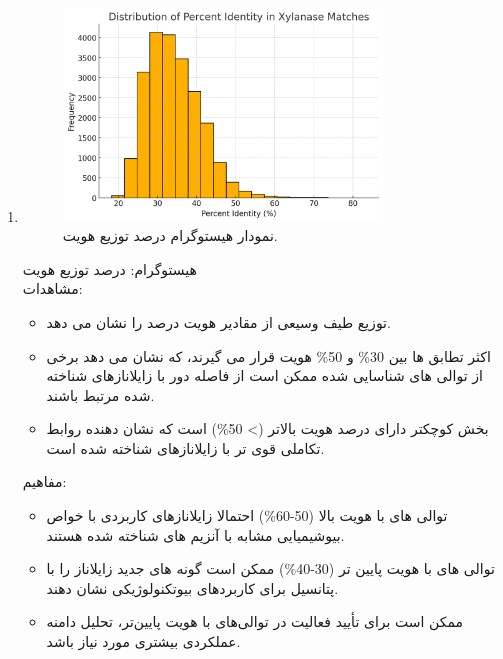         \begin{enumerate}[label=\alph*-]
            \item 
            \begin{figure}[H]
                \centering
                \includegraphics[width=0.8\textwidth]{images/dist_percent_identity.png} %
                \caption{نمودار هیستوگرام درصد توزیع هویت.}
                \label{fig:dist_percent_identity}
            \end{figure}
            هیستوگرام: درصد توزیع هویت \\
            مشاهدات:
            \begin{itemize}
                \item توزیع طیف وسیعی از مقادیر هویت درصد را نشان می دهد.
                \item اکثر تطابق ها بین 
                30\% 
                و 
                50\%
                هویت قرار می گیرند، که نشان می دهد برخی از توالی های شناسایی شده ممکن است از فاصله دور با زایلانازهای شناخته شده مرتبط باشند.
                \item بخش کوچکتر دارای درصد هویت بالاتر 
                (> 50\%) 
                است که نشان دهنده روابط تکاملی قوی تر با زایلانازهای شناخته شده است.
            \end{itemize}
            مفاهیم:
            \begin{itemize}
                \item توالی های با هویت بالا (50-60\%) احتمالا زایلانازهای کاربردی با خواص بیوشیمیایی مشابه با آنزیم های شناخته شده هستند.
                \item توالی های با هویت پایین تر (30-40\%) ممکن است گونه های جدید زایلاناز را با پتانسیل برای کاربردهای بیوتکنولوژیکی نشان دهند.
                \item ممکن است برای تأیید فعالیت در توالی‌های با هویت پایین‌تر، تحلیل دامنه عملکردی بیشتری مورد نیاز باشد.
            \end{itemize}


\end{enumerate}
